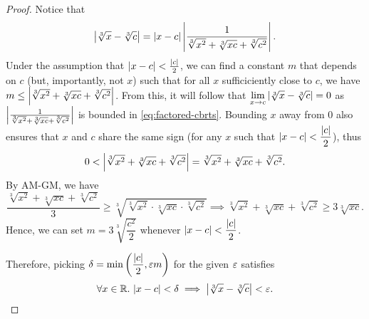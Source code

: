 \begin{problem}
\begin{enumerate}[label=(\alph*)]
\begin{proof}
        Notice that
        \[
          \left\lvert \sqrt[3]{x} - \sqrt[3]{c} \right\rvert = \left\lvert x - c \right\rvert \left\lvert  \frac{1}{\sqrt[3]{x^{2}} + \sqrt[3]{xc} + \sqrt[3]{c^{2}}}  \right\rvert.
        \]
        Under the assumption that $\left\lvert x - c \right\rvert < \frac{\left\lvert c \right\rvert}{2}$, we can find
        a constant $m$ that depends on $c$ (but, importantly, not $x$) such that 
        for all $x$ sufficiciently close to $c$, we have 
        $m \leq \left\lvert  \sqrt[3]{x^{2}} + \sqrt[3]{xc} + \sqrt[3]{c^{2}}  \right\rvert$.
        From this, it will follow that $\lim\limits_{x \to c} \left\lvert \sqrt[3]{x} - \sqrt[3]{c} \right\rvert = 0$
        as $\left\lvert  \frac{1}{\sqrt[3]{x^{2}} + \sqrt[3]{xc} + \sqrt[3]{c^{2}}}  \right\rvert$ is bounded in \eqref{eq:factored-cbrts}.
        Bounding $x$ away from $0$ also ensures that $x$ and $c$ share the same sign
        (for any $x$ such that $\left\lvert x - c \right\rvert < \dfrac{\left\lvert c \right\rvert}{2}$), thus
        \[
          0 < \left\lvert  \sqrt[3]{x^{2}} + \sqrt[3]{xc} + \sqrt[3]{c^{2}}  \right\rvert =  \sqrt[3]{x^{2}} + \sqrt[3]{xc} + \sqrt[3]{c^{2}}.
        \]
        By AM-GM, we have
        \[
          \frac{ \sqrt[3]{x^{2}} + \sqrt[3]{xc} + \sqrt[3]{c^{2}} }{3} \geq \sqrt[3]{ \sqrt[3]{x^{2}} \cdot \sqrt[3]{xc} \cdot \sqrt[3]{c^{2}} } \implies \sqrt[3]{x^{2}} + \sqrt[3]{xc} + \sqrt[3]{c^{2}} \geq 3 \sqrt[3]{xc}.
        \]
        Hence, we can set $m = 3 \sqrt[3]{\dfrac{c^{2}}{2}}$ whenever $\left\lvert x - c \right\rvert < \dfrac{\left\lvert c \right\rvert}{2}$.

        Therefore, picking $\delta = \min{\left( \dfrac{\left\lvert c \right\rvert}{2}, \varepsilon m \right)}$ for the given $\varepsilon$ satisfies
        \[
          \forall x \in \mathbb{R}.\, \left\lvert x - c \right\rvert < \delta \implies \left\lvert \sqrt[3]{x} - \sqrt[3]{c} \right\rvert < \varepsilon.
        \]
      \end{proof}

  \end{enumerate}

\end{problem}

